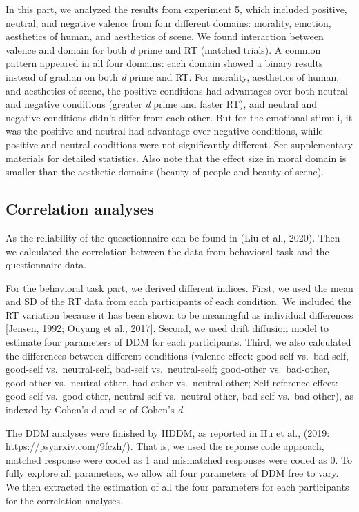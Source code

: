 \documentclass[
  man]{apa6}
\begin{document}
In this part, we analyzed the results from experiment 5, which included positive, neutral, and negative valence from four different domains: morality, emotion, aesthetics of human, and aesthetics of scene. We found interaction between valence and domain for both \emph{d} prime and RT (matched trials). A common pattern appeared in all four domains: each domain showed a binary results instead of gradian on both \emph{d} prime and RT. For morality, aesthetics of human, and aesthetics of scene, the positive conditions had advantages over both neutral and negative conditions (greater \emph{d} prime and faster RT), and neutral and negative conditions didn't differ from each other. But for the emotional stimuli, it was the positive and neutral had advantage over negative conditions, while positive and neutral conditions were not significantly different. See supplementary materials for detailed statistics. Also note that the effect size in moral domain is smaller than the aesthetic domains (beauty of people and beauty of scene).

\hypertarget{correlation-analyses}{%
\subsection{Correlation analyses}\label{correlation-analyses}}

As the reliability of the quesetionnaire can be found in (Liu et al., 2020). Then we calculated the correlation between the data from behavioral task and the questionnaire data.

For the behavioral task part, we derived different indices. First, we used the mean and SD of the RT data from each participants of each condition. We included the RT variation because it has been shown to be meaningful as individual differences {[}Jensen, 1992; Ouyang et al., 2017{]}. Second, we used drift diffusion model to estimate four parameters of DDM for each participants. Third, we also calculated the differences between different conditions (valence effect: good-self vs.~bad-self, good-self vs.~neutral-self, bad-self vs.~neutral-self; good-other vs.~bad-other, good-other vs.~neutral-other, bad-other vs.~neutral-other; Self-reference effect: good-self vs.~good-other, neutral-self vs.~neutral-other, bad-self vs.~bad-other), as indexed by Cohen's d and se of Cohen's \emph{d}.

The DDM analyses were finished by HDDM, as reported in Hu et al., (2019: \url{https://psyarxiv.com/9fczh/}). That is, we used the reponse code approach, matched response were coded as 1 and mismatched responses were coded as 0. To fully explore all parameters, we allow all four parameters of DDM free to vary. We then extracted the estimation of all the four parameters for each participants for the correlation analyses.
\end{document}
